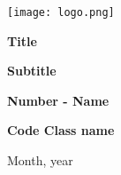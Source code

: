 \begin{titlepage}
    \begin{center}
        \vspace*{1cm}

        \texttt{[image: logo.png]}
        \vspace*{2cm}

        \Large
        \textbf{Title}

        \vspace*{1cm}
        \textbf{Subtitle}

        \vspace{3cm}
        \normalsize
        \textbf{Number - Name}
        \vspace{1cm}

        \textbf{Code Class name}

        \vfill
        Month, year\\

    \end{center}

\end{titlepage}
